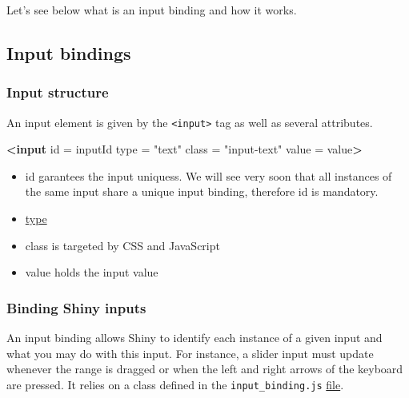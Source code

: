 \documentclass[]{book}
\newenvironment{Shaded}{\begin{snugshade}}{\end{snugshade}}
\newcommand{\KeywordTok}[1]{\textcolor[rgb]{0.13,0.29,0.53}{\textbf{#1}}}
\newcommand{\OtherTok}[1]{\textcolor[rgb]{0.56,0.35,0.01}{#1}}
\newcommand{\StringTok}[1]{\textcolor[rgb]{0.31,0.60,0.02}{#1}}
\providecommand{\tightlist}{%
  \setlength{\itemsep}{0pt}\setlength{\parskip}{0pt}}
\begin{document}
Let's see below what is an input binding and how it works.

\hypertarget{input-bindings}{%
\subsection{Input bindings}\label{input-bindings}}

\hypertarget{input-structure}{%
\subsubsection{Input structure}\label{input-structure}}

An input element is given by the \texttt{\textless{}input\textgreater{}} tag as well as several attributes.

\begin{Shaded}
\begin{Highlighting}[]
\KeywordTok{<input}\OtherTok{ id} \OtherTok{=} \StringTok{inputId}\OtherTok{ type} \OtherTok{=} \StringTok{"text"}\OtherTok{ class} \OtherTok{=} \StringTok{"input-text"}\OtherTok{ value} \OtherTok{=} \StringTok{value}\KeywordTok{>}
\end{Highlighting}
\end{Shaded}

\begin{itemize}
\tightlist
\item
  id garantees the input uniquess. We will see very soon that all instances of the same input share a unique input binding, therefore id is mandatory.
\item
  \href{https://www.w3schools.com/tags/att_input_type.asp}{type}
\item
  class is targeted by CSS and JavaScript
\item
  value holds the input value
\end{itemize}

\hypertarget{binding-shiny-inputs}{%
\subsubsection{Binding Shiny inputs}\label{binding-shiny-inputs}}

An input binding allows Shiny to identify each instance of a given input and what you may do with this input. For instance, a slider input must update whenever the range is dragged or when the left and right arrows of the keyboard are pressed. It relies on a class defined in the \texttt{input\_binding.js} \href{https://github.com/rstudio/shiny/blob/master/srcjs/input_binding.js}{file}.
\end{document}
